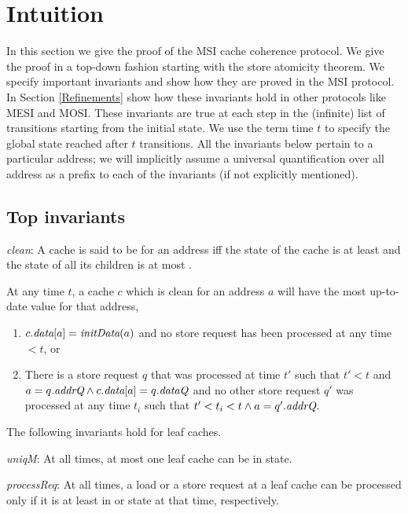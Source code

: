 \section{Intuition}

In this section we give the proof of the MSI cache coherence protocol. We give
the proof in a top-down fashion starting with the store atomicity theorem. We
specify important invariants and show how they are proved in the MSI protocol.
In Section \ref{Refinements} show how these invariants hold in other protocols
like MESI and MOSI. These invariants are true at each step in the (infinite)
list of transitions starting from the initial state. We use the term time $t$
to specify the global state reached after $t$ transitions.  All the invariants
below pertain to a particular address; we will implicitly assume a universal
quantification over all address as a prefix to each of the invariants (if not
explicitly mentioned).

\subsection{Top invariants}
\begin{defn}
\textit{clean}: A cache is said to be \clean{} for an address iff the state of the
cache is at least \Sh{} and the state of all its children is at most \Sh.
\end{defn}
\begin{inv}
At any time $t$, a cache $c$ which is clean for an address $a$ will have the most
up-to-date value for that address, \ie
\begin{enumerate}
\item $c.\textit{data}[a] = \textit{initData}(a)$ and no store request has been processed at
any time $< t$, or
\item There is a store request $q$ that was processed at time $t'$ such that
$t' < t$ and $a = q.\textit{addrQ} \wedge c.\textit{data}[a] = q.\textit{dataQ}$ and no other store
request $q'$ was processed at any time $t_i$ such that $t' < t_i < t \wedge a =
q'.\textit{addrQ}$.
\end{enumerate}
\label{latestValue}
\end{inv}

The following invariants hold for leaf caches.
\begin{inv}
\textit{uniqM}: At all times, at most one leaf cache can be in \Mo{} state.
\label{uniqM}
\end{inv}

\begin{inv}
\textit{processReq}: At all times, a load or a store request at a leaf cache can be processed
only if it is at least in \Sh{} or \Mo{} state at that time, respectively.
\label{processReq}
\end{inv}

